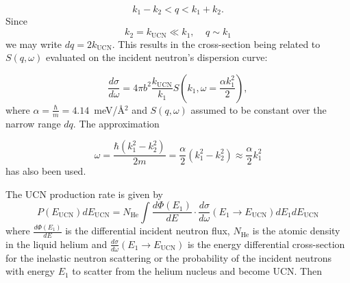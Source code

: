 \begin{equation}
k_1-k_2 < q < k_1+k_2.
\end{equation}
Since
\begin{equation}
k_2=k_{\text{UCN}} \ll k_1, \; \; \; \; q\sim k_1 
\end{equation}
we may write $dq=2k_{\text{UCN}}$. This results in the cross-section
being related to $S(q,\omega)$ evaluated on the incident neutron's
dispersion curve:

\begin{equation}
\frac{d\sigma}{d\omega}=4\pi b^2 \frac{k_{\text{UCN}}}{k_1}S \left(
k_1, \omega=\frac{\alpha k_1^2}{2} \right),
\end{equation}
where $\alpha=\frac{\hbar}{m}=4.14$~meV/\AA$^2$ and $S(q,\omega)$
assumed to be constant over the narrow range $dq$. The approximation

\begin{equation}
\omega=\frac{\hbar (k_1^2-k_2^2)}{2m}=\frac{\alpha}{2} (k_1^2 -
k_2^2)\approx \frac{\alpha}{2}k_1^2
\end{equation}
has also been used.

The UCN production rate is given by
\begin{equation}
\label{UCN_production}
P(E_{\text{UCN}}) dE_{\text{UCN}} = N_{\text{He}} \int \frac{d\Phi
  (E_1)}{dE}\cdot \frac{d \sigma}{d \omega}(E_1 \rightarrow
E_{\text{UCN}}) dE_1 dE_{\text{UCN}}
\end{equation}
where $\frac{d\Phi (E_1)}{dE}$ is the differential incident neutron
flux, $N_{\text{He}}$ is the atomic density in the liquid helium and $\frac{d
  \sigma}{d \omega}(E_1 \rightarrow E_{\text{UCN}})$ is the energy
differential cross-section for the inelastic neutron scattering or the
probability of the incident neutrons with energy $E_1$ to scatter from
the helium nucleus and become UCN.  Then

